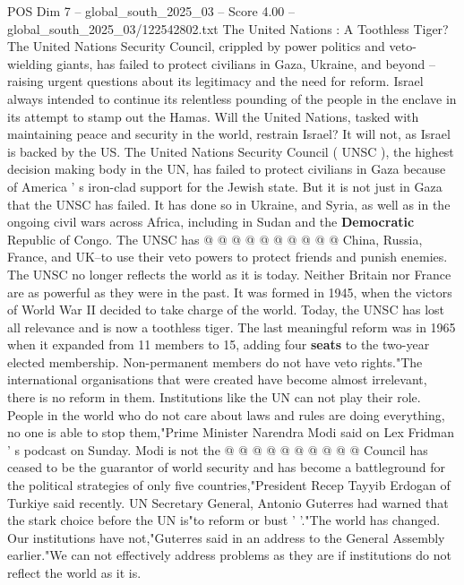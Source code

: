\begin{textsample}{POS Dim 7 – global\_south\_2025\_03 – Score 4.00 – global\_south\_2025\_03/122542802.txt}  \label{ex:f7_pos_427}
The United Nations : A Toothless Tiger?
The United Nations Security Council, crippled by power politics and veto-wielding giants, has failed to protect civilians in Gaza, Ukraine, and beyond -- raising urgent questions about its legitimacy and the need for reform.
Israel always intended to continue its relentless pounding of the people in the enclave in its attempt to stamp out the Hamas.
Will the United Nations, tasked with maintaining peace and security in the world, restrain Israel?
It will not, as Israel is backed by the US.
The United Nations Security Council ( UNSC ), the highest decision making body in the UN, has failed to protect civilians in Gaza because of America ' s iron-clad support for the Jewish state.
But it is not just in Gaza that the UNSC has failed.
It has done so in Ukraine, and Syria, as well as in the ongoing civil wars across Africa, including in Sudan and the \textbf{Democratic} Republic of Congo.
The UNSC has @ @ @ @ @ @ @ @ @ @ China, Russia, France, and UK--to use their veto powers to protect friends and punish enemies.
The UNSC no longer reflects the world as it is today.
Neither Britain nor France are as powerful as they were in the past.
It was formed in 1945, when the victors of World War II decided to take charge of the world.
Today, the UNSC has lost all relevance and is now a toothless tiger.
The last meaningful reform was in 1965 when it expanded from 11 members to 15, adding four \textbf{seats} to the two-year elected membership.
Non-permanent members do not have veto rights."The international organisations that were created have become almost irrelevant, there is no reform in them.
Institutions like the UN can not play their role.
People in the world who do not care about laws and rules are doing everything, no one is able to stop them,"Prime Minister Narendra Modi said on Lex Fridman ' s podcast on Sunday.
Modi is not the @ @ @ @ @ @ @ @ @ @ Council has ceased to be the guarantor of world security and has become a battleground for the political strategies of only five countries,"President Recep Tayyib Erdogan of Turkiye said recently.
UN Secretary General, Antonio Guterres had warned that the stark choice before the UN is"to reform or bust ' '."The world has changed.
Our institutions have not,"Guterres said in an address to the General Assembly earlier."We can not effectively address problems as they are if institutions do not reflect the world as it is.

\end{textsample}
